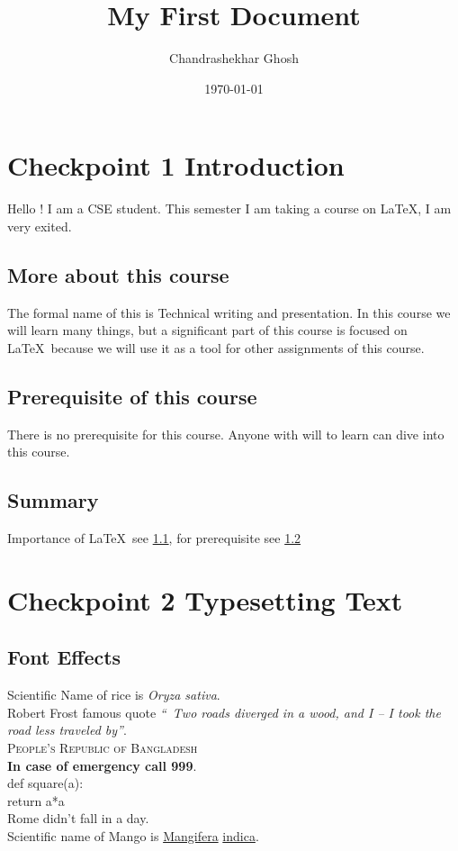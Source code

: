 \documentclass[a4paper,12pt]{article}
\begin{document}
\title{My First Document}
\author{Chandrashekhar Ghosh}
\date{\today}
\maketitle

\newpage
{}
\tableofcontents
\newpage
{}

\section{Checkpoint 1 Introduction}
Hello ! I am a CSE student. This semester I am taking a course on \LaTeX, I am very exited.

\subsection{More about this course}
\label{Sec 1}

The formal name of this is Technical writing and presentation. In this course we will learn many things, but a significant part of this course is focused on \LaTeX\ because we will use it as a tool for other assignments of this course.

\subsection{Prerequisite of this course}
\label{Sec 2}

There is no prerequisite for this course. Anyone with will to learn can dive into this course.

\subsection{Summary}
Importance of \LaTeX\ see \ref{Sec 1}, for prerequisite see \ref{Sec 2}

\newpage

\section{Checkpoint 2 Typesetting Text}

\subsection{Font Effects}
Scientific Name of rice is \textit{Oryza sativa}.\\
Robert Frost famous quote \textsl{“\ Two roads diverged in a wood, and I – I took the road less traveled by”}.\\
\textsc{People's Republic of Bangladesh}\\
\textbf{In case of emergency call 999}.\\
\textsf{def square(a):\\ \indent return a*a }\\
\textrm{Rome didn't fall in a day}.\\
Scientific name of Mango is \underline{Mangifera} \underline{indica}.\\
\end{document}
